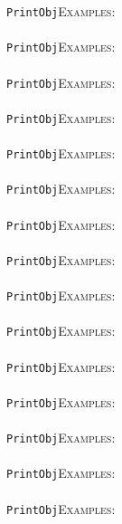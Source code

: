 \documentclass[a4paper,11pt]{report}
\begin{document}
{{ \texttt{PrintObj}{\nobreakspace}{\nobreakspace}{\nobreakspace}{\nobreakspace}\textsc{Examples:} \\
 \\
 \texttt{PrintObj}{\nobreakspace}{\nobreakspace}{\nobreakspace}{\nobreakspace}\textsc{Examples:} \\
 \\
 \texttt{PrintObj}{\nobreakspace}{\nobreakspace}{\nobreakspace}{\nobreakspace}\textsc{Examples:} \\
 \\
 \texttt{PrintObj}{\nobreakspace}{\nobreakspace}{\nobreakspace}{\nobreakspace}\textsc{Examples:} \\
 \\
 \texttt{PrintObj}{\nobreakspace}{\nobreakspace}{\nobreakspace}{\nobreakspace}\textsc{Examples:} \\
 \\
 \texttt{PrintObj}{\nobreakspace}{\nobreakspace}{\nobreakspace}{\nobreakspace}\textsc{Examples:} \\
 \\
 \texttt{PrintObj}{\nobreakspace}{\nobreakspace}{\nobreakspace}{\nobreakspace}\textsc{Examples:} \\
 \\
 \texttt{PrintObj}{\nobreakspace}{\nobreakspace}{\nobreakspace}{\nobreakspace}\textsc{Examples:} \\
 \\
 \texttt{PrintObj}{\nobreakspace}{\nobreakspace}{\nobreakspace}{\nobreakspace}\textsc{Examples:} \\
 \\
 \texttt{PrintObj}{\nobreakspace}{\nobreakspace}{\nobreakspace}{\nobreakspace}\textsc{Examples:} \\
 \\
 \texttt{PrintObj}{\nobreakspace}{\nobreakspace}{\nobreakspace}{\nobreakspace}\textsc{Examples:} \\
 \\
 \texttt{PrintObj}{\nobreakspace}{\nobreakspace}{\nobreakspace}{\nobreakspace}\textsc{Examples:} \\
 \\
 \texttt{PrintObj}{\nobreakspace}{\nobreakspace}{\nobreakspace}{\nobreakspace}\textsc{Examples:} \\
 \\
 \texttt{PrintObj}{\nobreakspace}{\nobreakspace}{\nobreakspace}{\nobreakspace}\textsc{Examples:} \\
 \\
 \texttt{PrintObj}{\nobreakspace}{\nobreakspace}{\nobreakspace}{\nobreakspace}\textsc{Examples:} \\
}}
\end{document}
